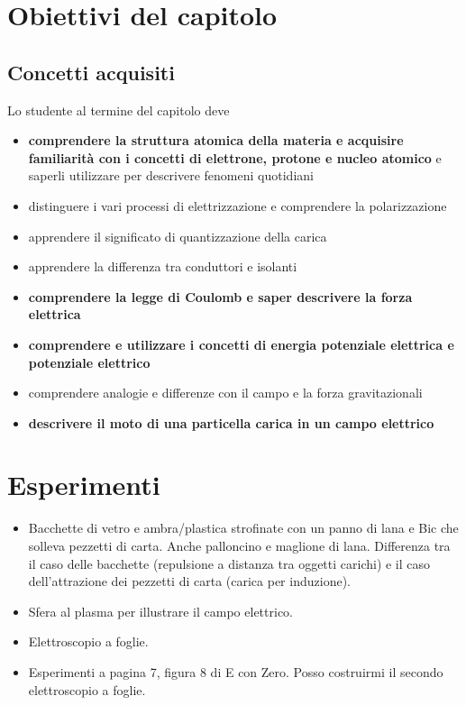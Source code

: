 \documentclass[11pt]{report}
\begin{document}
\section*{Obiettivi del capitolo}

\subsection*{Concetti acquisiti}

Lo studente al termine del capitolo deve
\begin{itemize}
    \item \textbf{comprendere la struttura atomica della materia e acquisire familiarità con i concetti di elettrone, protone e nucleo atomico} e saperli utilizzare per descrivere fenomeni quotidiani
    \item distinguere i vari processi di elettrizzazione e comprendere la polarizzazione
    \item apprendere il significato di quantizzazione della carica
    \item apprendere la differenza tra conduttori e isolanti
    \item \textbf{comprendere la legge di Coulomb e saper descrivere la forza elettrica}
    \item \textbf{comprendere e utilizzare i concetti di energia potenziale elettrica e potenziale elettrico}
    \item comprendere analogie e differenze con il campo e la forza gravitazionali
    \item \textbf{descrivere il moto di una particella carica in un campo elettrico}
\end{itemize}

\section*{Esperimenti}
\begin{itemize}
    \item Bacchette di vetro e ambra/plastica strofinate con un panno di lana e Bic che solleva pezzetti di carta. Anche palloncino e maglione di lana. Differenza tra il caso delle bacchette (repulsione a distanza tra oggetti carichi) e il caso dell'attrazione dei pezzetti di carta (carica per induzione).
    \item Sfera al plasma per illustrare il campo elettrico.
    \item Elettroscopio a foglie.
    \item Esperimenti a pagina 7, figura 8 di E con Zero. Posso costruirmi il secondo elettroscopio a foglie.
\end{itemize}
\end{document}
